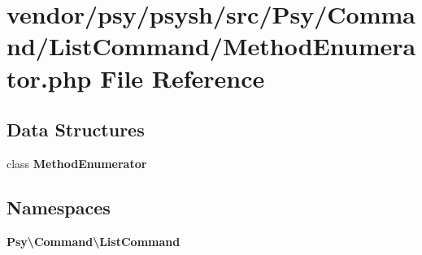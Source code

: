 \section{vendor/psy/psysh/src/\+Psy/\+Command/\+List\+Command/\+Method\+Enumerator.php File Reference}
\label{_method_enumerator_8php}
\subsection*{Data Structures}
\begin{DoxyCompactItemize}
\item 
class {\bf Method\+Enumerator}
\end{DoxyCompactItemize}
\subsection*{Namespaces}
\begin{DoxyCompactItemize}
\item 
 {\bf Psy\textbackslash{}\+Command\textbackslash{}\+List\+Command}
\end{DoxyCompactItemize}
